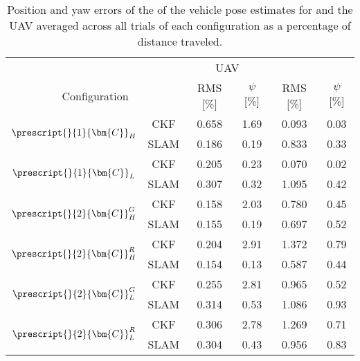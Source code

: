 \begin{table}
	\centering
	\caption{Position and yaw errors of the of the vehicle pose estimates for  and the UAV averaged across all trials of each configuration as a percentage of distance traveled.}
	\label{tab:EvD}
	\renewcommand{\arraystretch}{1.25}
	\begin{tabular}{c c | c c | c c }
		\toprule
		\toprule
		& &\multicolumn{2}{c|}{UAV} 
		& \multicolumn{2}{c}{\textsub{UGV}{1}}  \\ 
		\multicolumn{2}{c|}{Configuration} & RMS [\%] & $\psi$ [\%] & RMS [\%] & $\psi$ [\%]  \\ 
		\midrule
			\multirow{2}{*}{$\prescript{}{1}{\bm{C}}_{H}^{}$}
				& CKF  &  0.658 &   1.69&  0.093 &   0.03 \\
				& SLAM &  0.186 &   0.19&  0.833 &   0.33 \\
		\midrule
			\multirow{2}{*}{$\prescript{}{1}{\bm{C}}_{L}^{}$}
				& CKF  &  0.205 &   0.23&  0.070 &   0.02 \\
				& SLAM &  0.307 &   0.32&  1.095 &   0.42 \\
		\midrule
			\multirow{2}{*}{$\prescript{}{2}{\bm{C}}_{H}^{G}$}
				& CKF  &  0.158 &   2.03&  0.780 &   0.45 \\
				& SLAM &  0.155 &   0.19&  0.697 &   0.52 \\
		\midrule
			\multirow{2}{*}{$\prescript{}{2}{\bm{C}}_{H}^{R}$}
				& CKF  &  0.204 &   2.91&  1.372 &   0.79 \\
				& SLAM &  0.154 &   0.13&  0.587 &   0.44 \\
		\midrule
			\multirow{2}{*}{$\prescript{}{2}{\bm{C}}_{L}^{G}$}
				& CKF  &  0.255 &   2.81&  0.965 &   0.52 \\
				& SLAM &  0.314 &   0.53&  1.086 &   0.93 \\
		\midrule
			\multirow{2}{*}{$\prescript{}{2}{\bm{C}}_{L}^{R}$}
				& CKF  &  0.306 &   2.78&  1.269 &   0.71 \\
				& SLAM &  0.304 &   0.43&  0.956 &   0.83 \\
		\toprule
		\toprule
	\end{tabular}
	\renewcommand{\arraystretch}{1}
\end{table}
